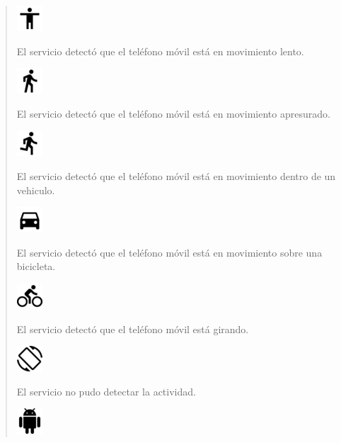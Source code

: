 {\begin{quote}
\begin{description}
\includegraphics{anexos/graphics/still.png}

\item[{Caminando}] \leavevmode
El servicio detectó que el teléfono móvil está en movimiento lento.

\includegraphics{anexos/graphics/walk.png}

\item[{Correr}] \leavevmode
El servicio detectó que el teléfono móvil está en movimiento apresurado.

\includegraphics{anexos/graphics/run.png}

\item[{En vehiculo}] \leavevmode
El servicio detectó que el teléfono móvil está en movimiento dentro de un vehiculo.

\includegraphics{anexos/graphics/car.png}

\item[{En bicicleta}] \leavevmode
El servicio detectó que el teléfono móvil está en movimiento sobre una bicicleta.

\includegraphics{anexos/graphics/bike.png}

\item[{Tilting}] \leavevmode
El servicio detectó que el teléfono móvil está girando.

\includegraphics{anexos/graphics/tilt.png}

\item[{Desconocido}] \leavevmode
El servicio no pudo detectar la actividad.

\includegraphics{anexos/graphics/unk.png}


\end{description}
\end{quote}}
